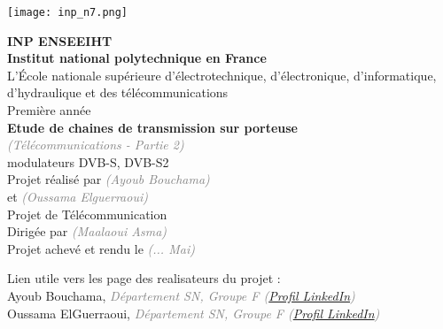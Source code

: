 \documentclass[11pt]{article}
\newcommand{\Gray}[1]{\textcolor{gray}{\textit{#1}}}
\begin{document}
\pagestyle{fancy}
\fancyhf{} %
\renewcommand{\headrulewidth}{0.4pt} %
\fancyfoot[C]{\thepage} %
\renewcommand{\footrulewidth}{0.4pt} %


\hfill
\texttt{[image: inp\_n7.png]}

\vspace*{8mm}

\begin{center}
\LARGE
{\bfseries
INP ENSEEIHT\\[2mm]
Institut national polytechnique en France\\[3mm]
}
\large 
L'École nationale supérieure d'électrotechnique, d'électronique, d'informatique, d'hydraulique et des télécommunications \\[2mm]
Première année\\[10mm]
\Huge
{\bfseries Etude de chaines de transmission sur porteuse
}\\
\Gray{\LARGE (Télécommunications - Partie 2)}\\[6mm]
\huge 
modulateurs DVB-S, DVB-S2\\[8mm]

\Large 
Projet réalisé par \Gray{(Ayoub Bouchama)} \\[1mm]
et \Gray{(Oussama Elguerraoui)} \\[6mm]
Projet de Télécommunication \\[6mm]
Dirigée par  \Gray{(Maalaoui Asma)}\\[8mm]
Projet achevé et rendu le \Gray{(... Mai)}\\[10mm]

\end{center}

Lien utile vers les page des realisateurs du projet :\\[3mm]
Ayoub Bouchama, \Gray{Département SN, Groupe F (\href{https://www.linkedin.com/in/ayoubbouchama/}{Profil LinkedIn}) }\\
Oussama ElGuerraoui, \Gray{Département SN, Groupe F (\href{https://www.linkedin.com/in/oussama-elguerraoui-4770b51aa/}{Profil LinkedIn}) }\\

\newpage
\parskip 7pt

\end{document}
